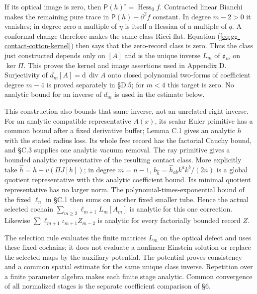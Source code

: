 \documentclass[
  english,
  11pt,
  reqno]{amsart}
\begin{document}
If its optical image is zero, then
\(\mathsf P(h)^\circ=\operatorname{Hess}_0f\). Contracted linear Bianchi
makes the remaining pure trace in \(\mathsf P(h)-\partial^2f\) constant.
In degree \(m-2>0\) it vanishes; in degree zero a multiple of \(\eta\)
is itself a Hessian of a multiple of \(q\). A conformal change therefore
makes the same class Ricci-flat. Equation
(\ref{eq:gg-contact-cotton-kernel}) then says that the zero-record class
is zero. Thus the class just constructed depends only on \([A]\) and is
the unique inverse \(L_m\) of \(\mathfrak o_m\) on \(\ker\Pi\). This
proves the kernel and image assertions used in Appendix D. Surjectivity
of \(d_m[A]=\mathrm d\,\operatorname{div}A\) onto closed polynomial
two-forms of coefficient degree \(m-4\) is proved separately in §D.5;
for \(m<4\) this target is zero. No analytic bound for an inverse of
\(d_m\) is used in the estimate below.

This construction also bounds that same inverse, not an unrelated right
inverse. For an analytic compatible representative \(A(x)\), its scalar
Euler primitive has a common bound after a fixed derivative buffer;
Lemma C.1 gives an analytic \(h\) with the stated radius loss. Its whole
free record has the factorial Cauchy bound, and §C.3 supplies one
analytic vacuum removal. The ray primitive gives a bounded analytic
representative of the resulting contact class. More explicitly take
\(\widehat h=h-v(\Pi J[h])\); in degree \(m=n-1\),
\(b_{\widehat h}=\widehat h_{ab}k^ak^b/(2n)\) is a global quotient
representative with this analytic coefficient bound. Its minimal
quotient representative has no larger norm. The
polynomial-times-exponential bound of the fixed \(\ell_n\) in §C.1 then
sums on another fixed smaller tube. Hence the actual selected cochain
\(\sum_{m\ge2}\ell_{m+1}L_m[A_m]\) is analytic for this one correction.
Likewise \(\sum\ell_{m+1}\iota_{m+1}Z_{m-2}\) is analytic for every
factorially bounded record \(Z\).

The selection rule evaluates the finite matrices \(L_m\) on the optical
defect and uses these fixed cochains; it does not evaluate a nonlinear
Einstein solution or replace the selected maps by the auxiliary
potential. The potential proves consistency and a common spatial
estimate for the same unique class inverse. Repetition over a finite
parameter algebra makes each finite stage analytic. Common convergence
of all normalized stages is the separate coefficient comparison of §6.

\protect{}\label{app:gg-optical}
\end{document}
